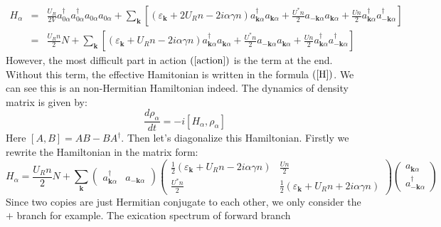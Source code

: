 \documentclass[aps,onecolumn,superscriptaddress,notitlepage,longbibliography]{revtex4-1}
\begin{document}
\begin{eqnarray}
  H_{\alpha} & = & \frac{U_R}{2 V} a_{0 \alpha}^{\dagger} a_{0
  \alpha}^{\dagger} a_{0 \alpha} a_{0 \alpha} + \sum_{\mathbf{k}} \left[
  (\varepsilon_{\mathbf{k}} + 2 U_R n - 2 i \alpha \gamma n) a_{\mathbf{k}
  \alpha}^{\dagger} a_{\mathbf{k} \alpha} + \frac{U^{\ast} n}{2}
  a_{-\mathbf{k} \alpha} a_{\mathbf{k} \alpha} + \frac{U n}{2}
  a_{\mathbf{k} \alpha}^{\dagger} a_{-\mathbf{k} \alpha}^{\dagger} \right]
  \nonumber\\
  & = & \frac{U_R n}{2} N + \sum_{\mathbf{k}} \left[
  (\varepsilon_{\mathbf{k}} + U_R n - 2 i \alpha \gamma n) a_{\mathbf{k}
  \alpha}^{\dagger} a_{\mathbf{k} \alpha} + \frac{U^{\ast} n}{2}
  a_{-\mathbf{k} \alpha} a_{\mathbf{k} \alpha} + \frac{U n}{2}
  a_{\mathbf{k} \alpha}^{\dagger} a_{-\mathbf{k} \alpha}^{\dagger} \right]
  \label{H} 
\end{eqnarray}
However, the most difficult part in action $\left( \ref{action} \right)$ is
the term at the end. Without this term, the effective Hamitonian is written in
the formula $\left( \ref{H} \right)$. We can see this is an non-Hermitian
Hamiltonian indeed. The dynamics of density matrix is given by:
\begin{equation}
  \frac{d \rho_{\alpha}}{d t} = - i [H_{\alpha}, \rho_{\alpha}]
\end{equation}
Here $[A, B] = A B - B A^{\dagger}$. Then let's diagonalize this Hamiltonian.
Firstly we rewrite the Hamiltonian in the matrix form:
\begin{equation}
  H_{\alpha} = \frac{U_R n}{2} N + \sum_{\mathbf{k}} \left(\begin{array}{cc}
    a_{\mathbf{k} \alpha}^{\dagger} & a_{-\mathbf{k} \alpha}
  \end{array}\right) \left(\begin{array}{cc}
    \frac{1}{2} (\varepsilon_{\mathbf{k}} + U_R n - 2 i \alpha \gamma n) &
    \frac{U n}{2}\\
    \frac{U^{\ast} n}{2} & \frac{1}{2} (\varepsilon_{\mathbf{k}} + U_R n + 2
    i \alpha \gamma n)
  \end{array}\right) \left(\begin{array}{c}
    a_{\mathbf{k} \alpha}\\
    a_{-\mathbf{k} \alpha}^{\dagger}
  \end{array}\right)
\end{equation}
Since two copies are just Hermitian conjugate to each other, we only consider
the $+$ branch for example. The exication spectrum of forward branch
\end{document}
